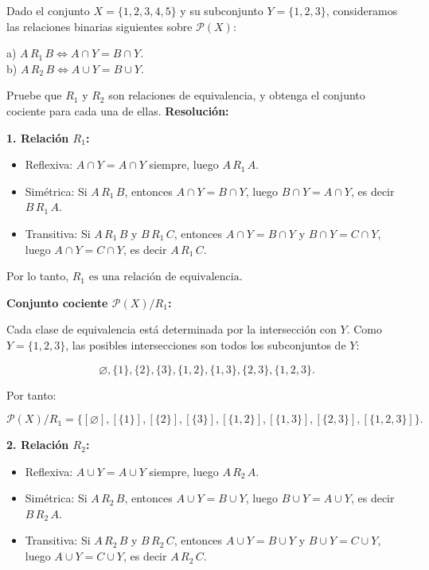 \documentclass[a4paper,12pt]{article}
\begin{document}
\begin{ejercicio}[title=Ejercicio 14]
Dado el conjunto $X = \{1,2,3,4,5\}$ y su subconjunto $Y = \{1,2,3\}$, consideramos las relaciones binarias siguientes sobre $\mathcal{P}(X)$:

a) $A\,R_1\,B \iff A\cap Y = B\cap Y$.\\
b) $A\,R_2\,B \iff A\cup Y = B\cup Y$.

Pruebe que $R_1$ y $R_2$ son relaciones de equivalencia, y obtenga el conjunto cociente para cada una de ellas.
\tcblower
\textbf{Resolución:}

\textbf{1. Relación $R_1$:}

\begin{itemize}
\item Reflexiva: $A\cap Y = A\cap Y$ siempre, luego $A\,R_1\,A$.  
\item Simétrica: Si $A\,R_1\,B$, entonces $A\cap Y = B\cap Y$, luego $B\cap Y = A\cap Y$, es decir $B\,R_1\,A$.  
\item Transitiva: Si $A\,R_1\,B$ y $B\,R_1\,C$, entonces $A\cap Y = B\cap Y$ y $B\cap Y = C\cap Y$, luego $A\cap Y = C\cap Y$, es decir $A\,R_1\,C$.  
\end{itemize}

Por lo tanto, \(\boxed{R_1 \text{ es una relación de equivalencia.}}\)

\vspace{0.5em}

\textbf{Conjunto cociente $\mathcal{P}(X)/R_1$:}  

Cada clase de equivalencia está determinada por la intersección con $Y$. Como $Y = \{1,2,3\}$, las posibles intersecciones son todos los subconjuntos de $Y$:

\[
\varnothing, \{1\}, \{2\}, \{3\}, \{1,2\}, \{1,3\}, \{2,3\}, \{1,2,3\}.
\]

Por tanto:

\[
\boxed{\mathcal{P}(X)/R_1 = \{ [\varnothing], [\{1\}], [\{2\}], [\{3\}], [\{1,2\}], [\{1,3\}], [\{2,3\}], [\{1,2,3\}] \}}.
\]

\vspace{0.5em}

\textbf{2. Relación $R_2$:}

\begin{itemize}
\item Reflexiva: $A\cup Y = A\cup Y$ siempre, luego $A\,R_2\,A$.  
\item Simétrica: Si $A\,R_2\,B$, entonces $A\cup Y = B\cup Y$, luego $B\cup Y = A\cup Y$, es decir $B\,R_2\,A$.  
\item Transitiva: Si $A\,R_2\,B$ y $B\,R_2\,C$, entonces $A\cup Y = B\cup Y$ y $B\cup Y = C\cup Y$, luego $A\cup Y = C\cup Y$, es decir $A\,R_2\,C$.  
\end{itemize}


\end{ejercicio}
\end{document}
